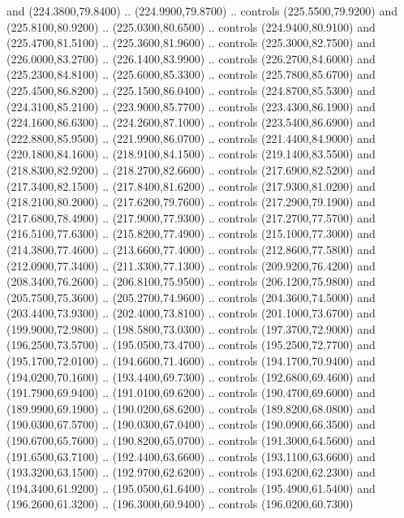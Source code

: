 {\begin{scope}[y=0.80pt, x=0.80pt, yscale=-1, xscale=1, inner sep=0pt, outer sep=0pt, #1]
      and (224.3800,79.8400) .. (224.9900,79.8700) .. controls (225.5500,79.9200)
      and (225.8100,80.9200) .. (225.0300,80.6500) .. controls (224.9400,80.9100)
      and (225.4700,81.5100) .. (225.3600,81.9600) .. controls (225.3000,82.7500)
      and (226.0000,83.2700) .. (226.1400,83.9900) .. controls (226.2700,84.6000)
      and (225.2300,84.8100) .. (225.6000,85.3300) .. controls (225.7800,85.6700)
      and (225.4500,86.8200) .. (225.1500,86.0400) .. controls (224.8700,85.5300)
      and (224.3100,85.2100) .. (223.9000,85.7700) .. controls (223.4300,86.1900)
      and (224.1600,86.6300) .. (224.2600,87.1000) .. controls (223.5400,86.6900)
      and (222.8800,85.9500) .. (221.9900,86.0700) .. controls (221.4400,84.9000)
      and (220.1800,84.1600) .. (218.9100,84.1500) .. controls (219.1400,83.5500)
      and (218.8300,82.9200) .. (218.2700,82.6600) .. controls (217.6900,82.5200)
      and (217.3400,82.1500) .. (217.8400,81.6200) .. controls (217.9300,81.0200)
      and (218.2100,80.2000) .. (217.6200,79.7600) .. controls (217.2900,79.1900)
      and (217.6800,78.4900) .. (217.9000,77.9300) .. controls (217.2700,77.5700)
      and (216.5100,77.6300) .. (215.8200,77.4900) .. controls (215.1000,77.3000)
      and (214.3800,77.4600) .. (213.6600,77.4000) .. controls (212.8600,77.5800)
      and (212.0900,77.3400) .. (211.3300,77.1300) .. controls (209.9200,76.4200)
      and (208.3400,76.2600) .. (206.8100,75.9500) .. controls (206.1200,75.9800)
      and (205.7500,75.3600) .. (205.2700,74.9600) .. controls (204.3600,74.5000)
      and (203.4400,73.9300) .. (202.4000,73.8100) .. controls (201.1000,73.6700)
      and (199.9000,72.9800) .. (198.5800,73.0300) .. controls (197.3700,72.9000)
      and (196.2500,73.5700) .. (195.0500,73.4700) .. controls (195.2500,72.7700)
      and (195.1700,72.0100) .. (194.6600,71.4600) .. controls (194.1700,70.9400)
      and (194.0200,70.1600) .. (193.4400,69.7300) .. controls (192.6800,69.4600)
      and (191.7900,69.9400) .. (191.0100,69.6200) .. controls (190.4700,69.6000)
      and (189.9900,69.1900) .. (190.0200,68.6200) .. controls (189.8200,68.0800)
      and (190.0300,67.5700) .. (190.0300,67.0400) .. controls (190.0900,66.3500)
      and (190.6700,65.7600) .. (190.8200,65.0700) .. controls (191.3000,64.5600)
      and (191.6500,63.7100) .. (192.4400,63.6600) .. controls (193.1100,63.6600)
      and (193.3200,63.1500) .. (192.9700,62.6200) .. controls (193.6200,62.2300)
      and (194.3400,61.9200) .. (195.0500,61.6400) .. controls (195.4900,61.5400)
      and (196.2600,61.3200) .. (196.3000,60.9400) .. controls (196.0200,60.7300)

\end{scope}}
